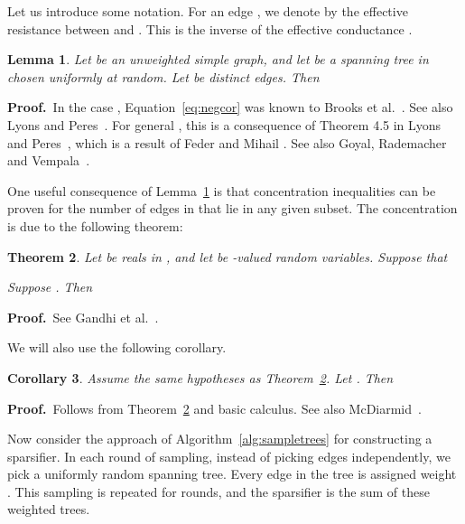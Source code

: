 \documentclass[11pt]{article}
\newcommand{\proofbelow}{8pt}
\numberwithin{equation}{section}
\newtheorem{theorem}{Theorem}[section]
\newtheorem{lemma}[theorem]{Lemma}
\newtheorem{corollary}[theorem]{Corollary}
\renewenvironment{proof}{\noindent\textbf{Proof.}\,}{\afterproof}
\newcommand{\afterproof}{\hfill  \par \vspace{\proofbelow}}
\newcommand{\Algorithm}[1]{Algorithm~\ref{alg:#1}}
\newcommand{\CorollaryName}[1]{\label{cor:#1}}
\newcommand{\LemmaName}[1]{\label{lem:#1}}
\newcommand{\Lemma}[1]{Lemma~\ref{lem:#1}}
\newcommand{\TheoremName}[1]{\label{thm:#1}}
\newcommand{\Theorem}[1]{Theorem~\ref{thm:#1}}
\begin{document}
Let us introduce some notation.
For an edge , we denote by  the effective resistance between  and .
This is the inverse of the effective conductance .

\begin{lemma}
\LemmaName{negcor}
Let  be an unweighted simple graph, and let  be a spanning tree in 
chosen uniformly at random.
Let  be distinct edges.
Then

\end{lemma}
\begin{proof}
In the case , Equation~\ref{eq:negcor} was known to Brooks et al.~\cite[Equation (2.34)]{BSST}.
See also Lyons and Peres~\cite[Exercise 4.3]{LyonsPeres}.
For general , this is a consequence of Theorem 4.5 in Lyons and Peres~\cite{LyonsPeres},
which is a result of Feder and Mihail \cite{FederMihail}.
See also Goyal, Rademacher and Vempala~\cite[Section 3]{GoyalRV09}.
\end{proof}

One useful consequence of \Lemma{negcor} is that concentration inequalities
can be proven for the number of edges in  that lie in any given subset.
The concentration is due to the following theorem:

\begin{theorem}
\TheoremName{concentration}
Let  be reals in ,
and let  be -valued random variables.
Suppose that

Suppose .
Then

\end{theorem}
\begin{proof}
See Gandhi et al.~\cite[Theorem 3.1]{Gandhi}.
\end{proof}

We will also use the following corollary.

\begin{corollary}
\CorollaryName{concentration}
Assume the same hypotheses as \Theorem{concentration}.
Let .
Then

\end{corollary}
\begin{proof}
Follows from \Theorem{concentration} and basic calculus.
See also McDiarmid~\cite[Theorem 2.3]{McDiarmid}.
\end{proof}

Now consider the approach of \Algorithm{sampletrees} for constructing a sparsifier.
In each round of sampling, instead of picking edges independently,
we pick a uniformly random spanning tree.
Every edge  in the tree is assigned weight .
This sampling is repeated for  rounds,
and the sparsifier is the sum of these weighted trees.
\end{document}

